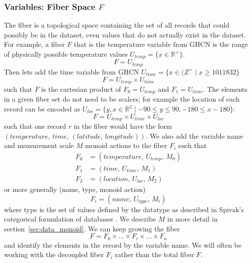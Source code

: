 \documentclass[../main.tex]{subfiles}
\begin{document}
\subsubsection{Variables: Fiber Space $F$}
\label{sec:data_fiber}
The fiber is a topological space containing the set of all records that could possibly be in the dataset, even values that do not actually exist in the dataset. For example, a fiber $F$ that is the temperature variable from GHCN is the range of physically possible temperature values $ U_{temp} = \{x \in \mathbb{R}^+\}$. 
\begin{equation}
    F = U_{temp}
\end{equation}
Then lets add the time variable from GHCN $U_{time} = \{x \in \mathbb({Z}^+ \mid x \geq 1011832\}$ 
\begin{equation}
F =  U_{temp} \times U_{time}
\end{equation}
such that $F$ is the cartesian product of $F_0=U_{temp}$ and $F_1 = U_{time}$. The elements in a given fiber set do not need to be scalers; for example the location of each record can be encoded as $U_{loc} = \{y, x \in \mathbb{R}^{2} \mid -90 \leq y \leq 90, -180 \leq x -180\}$: 
\begin{equation}
    F = U_{temp} \times U_{time} \times U_{loc}
\end{equation}
such that one record $r$ in the fiber would have the form $(temperature,\, time,\, (latitude,\, longitude))$. We also add the variable name and measurement scale $M$ monoid actions to the fiber $F_i$ such that 
\begin{align}
    F_0 &= (\textit{temperature},\, U_{temp},\, M_0)\\
    F_1 &= (\textit{time},\, U_{time},\, M_1)\\
    F_2 &= (\textit{location},\, U_{loc},\, M_2)
\end{align}
 or more generally (name, type, monoid action)
 \begin{equation}
    F_i = (\textit{name},\, U_{type},\, M_{i})
 \end{equation}
where type is the set of values defined by the datatype as described in Spivak's categorical formulation of databases \cite{spivakSIMPLICIALDATABASES}. We describe $M$ in more detail in section~\ref{sec:data_monoid}. We can keep growing the fiber
\begin{equation}
F= F_{0} \times \ldots \times F_{i}\times\ldots\times F_{n}
\end{equation}
and identify the elements in the record by the variable name. We will often be working with the decoupled fiber $F_i$ rather than the total fiber $F$. 
\end{document}
